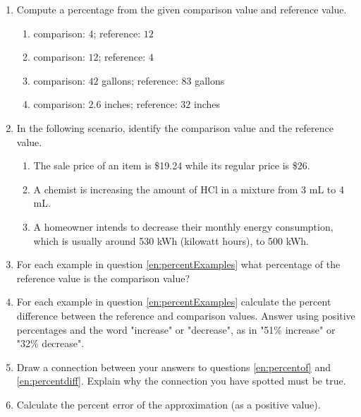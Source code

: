 \begin{enumerate}
\item Compute a percentage from the given comparison value and reference value.
\begin{enumerate}
\item comparison: $4$; reference: $12$
\item comparison: $12$; reference: $4$
\item comparison: $42$ gallons; reference: $83$ gallons
\item comparison: $2.6$ inches; reference: $32$ inches
\end{enumerate}
\item \label{en:percentExamples}In the following scenario, identify the comparison value and the reference value.
\begin{enumerate}
\item The sale price of an item is \$19.24 while its regular price is \$26. 
\item A chemist is increasing the amount of HCl in a mixture from 3 mL to 4 mL. 
\item A homeowner intends to decrease their monthly energy consumption, which is usually around 530 kWh (kilowatt hours), to 500 kWh. 
\end{enumerate}
\item \label{en:percentof}For each example in question \ref{en:percentExamples} what percentage of the reference value is the comparison value? 
\item \label{en:percentdiff}For each example in question \ref{en:percentExamples} calculate the percent difference between the reference and comparison values. Answer using positive percentages and the word "increase" or "decrease", as in "51\% increase" or "32\% decrease". 
\item Draw a connection between your answers to questions \ref{en:percentof} and \ref{en:percentdiff}. Explain why the connection you have spotted must be true. 
\item Calculate the percent error of the approximation (as a positive value).

\end{enumerate}
